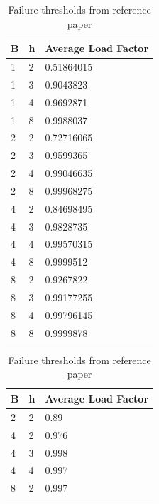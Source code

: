 \documentclass[11pt]{article}
\begin{document}
\begin{table}
\parbox{.45\linewidth}{
\centering
\small
\begin{tabular}{|l|l|l|}
\hline
\textbf{B} & \textbf{h} & \textbf{Average Load Factor} \\ \hline
1          & 2                 &0.51864015 \\ \hline
1          & 3                &0.9043823 \\ \hline
1          & 4           &0.9692871 \\ \hline
1          & 8               &0.9988037 \\ \hline
\rowcolor{gray!50}2          & 2           &0.72716065 \\ \hline
2          & 3                 &0.9599365 \\ \hline
2          & 4               &0.99046635 \\ \hline
2          & 8                &0.99968275 \\ \hline
\rowcolor{gray!50}4          & 2              &0.84698495 \\ \hline
\rowcolor{gray!50}4          & 3             &0.9828735 \\ \hline
\rowcolor{gray!50}4          & 4               &0.99570315 \\ \hline
4          & 8             &0.9999512 \\ \hline
\rowcolor{gray!50}8          & 2                &0.9267822 \\ \hline
8          & 3              &0.99177255 \\ \hline
8          & 4             &0.99796145 \\ \hline
8          & 8               &0.9999878 \\ \hline
\end{tabular}
\caption{Failure thresholds for varying choices of B and h.}}
\hfill
\parbox{.45\linewidth}{
\centering
\small
\begin{tabular}{|l|l|l|}
\hline
\textbf{B} & \textbf{h} & \textbf{Average Load Factor} \\ \hline
2          & 2            &0.89 \\ \hline
4          & 2            &0.976 \\ \hline
4          & 3            &0.998 \\ \hline
4          & 4            &0.997 \\ \hline
8 			&2 				&0.997 \\ \hline
\end{tabular}
\caption{Failure thresholds from reference paper}}
\end{table}
\end{document}
